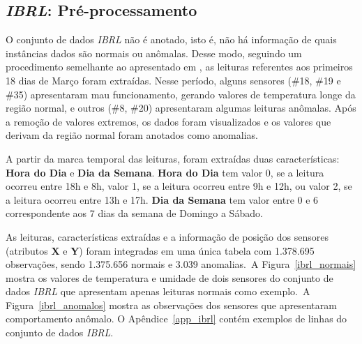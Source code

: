 \documentclass[cic,tc]{iiufrgs}
\begin{document}
\subsection{\textit{IBRL}: Pré-processamento}

O conjunto de dados \textit{IBRL} não é anotado, isto é, não há informação de quais instâncias dados são normais ou anômalas. Desse modo, seguindo um procedimento semelhante ao apresentado em \cite{DistributedFuzzy2013}, as leituras referentes aos primeiros 18 dias de Março foram extraídas. Nesse período, alguns sensores (\#18, \#19 e \#35) apresentaram mau funcionamento, gerando valores de temperatura longe da região normal, e outros (\#8, \#20) apresentaram algumas leituras anômalas. Após a remoção de valores extremos, os dados foram visualizados e os valores que derivam da região normal foram anotados como anomalias.

A partir da marca temporal das leituras, foram extraídas duas características: \textbf{Hora do Dia} e \textbf{Dia da Semana}. \textbf{Hora do Dia} tem valor 0, se a leitura ocorreu entre 18h e 8h, valor 1, se a leitura ocorreu entre 9h e 12h, ou valor 2, se a leitura ocorreu entre 13h e 17h. \textbf{Dia da Semana} tem valor entre 0 e 6 correspondente aos 7 dias da semana de Domingo a Sábado.

As leituras, características extraídas e a informação de posição dos sensores (atributos \textbf{X} e \textbf{Y}) foram integradas em uma única tabela com 1.378.695 observações, sendo 1.375.656 normais e 3.039 anomalias.~A Figura~\ref{ibrl_normais} mostra os valores de temperatura e umidade de dois sensores do conjunto de dados \textit{IBRL} que apresentam apenas leituras normais como exemplo.~A Figura~\ref{ibrl_anomalos} mostra as observações dos sensores que apresentaram comportamento anômalo. O Apêndice~\ref{app_ibrl} contém exemplos de linhas do conjunto de dados \textit{IBRL}.
\end{document}
